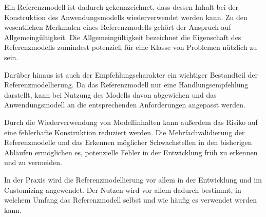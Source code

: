 Ein Referenzmodell ist dadurch gekennzeichnet, dass dessen Inhalt bei der Konstruktion des Anwendungsmodells wiederverwendet werden kann.\autocite[Vgl.][S.23]{BARTSCH2015} Zu den wesentlichen Merkmalen eines Referenzmodells gehört der Anspruch auf Allgemeingültigkeit. Die Allgemeingültigkeit bezeichnet die Eigenschaft des Referenzmodells zumindest potenziell für eine Klasse von Problemen nützlich zu sein. \autocite[Vgl.][S.15]{HARS1994}

Darüber hinaus ist auch der Empfehlungscharakter ein wichtiger Bestandteil der Referenzmodellierung. Da das Referenzmodell nur eine Handlungsempfehlung darstellt, kann bei Nutzung des Modells davon abgewichen und das Anwendungsmodell an die entsprechenden Anforderungen angepasst werden.\autocite[Vgl.][S.23-25]{BARTSCH2015} 


Durch die Wiederverwendung von Modellinhalten kann außerdem das Risiko auf eine fehlerhafte Konstruktion reduziert werden. Die Mehrfachvalidierung der Referenzmodelle und das Erkennen möglicher Schwachstellen in den bisherigen Abläufen ermöglichen es, potenzielle Fehler in der Entwicklung früh zu erkennen und zu vermeiden.\autocite[Vgl.][S.39-42]{KRCMAR2015}


In der Praxis wird die Referenzmodellierung vor allem in der Entwicklung und im Customizing angewendet. Der Nutzen wird vor allem dadurch bestimmt, in welchem Umfang das Referenzmodell selbst und wie häufig es verwendet werden kann.\autocite[Vgl.][S.1-2]{VOMBROCKE2018}


